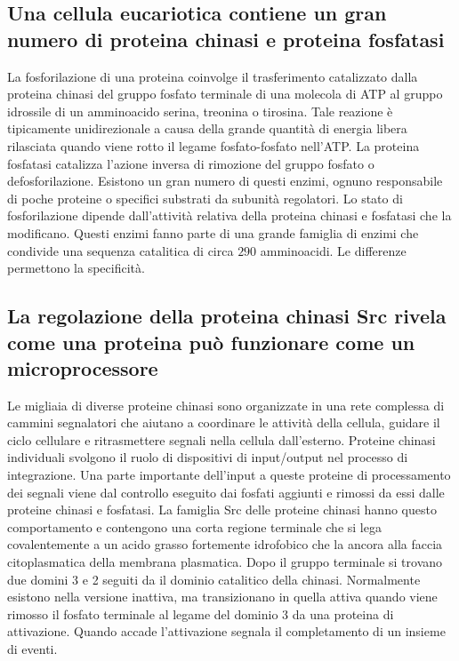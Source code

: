 \subsection{Una cellula eucariotica contiene un gran numero di proteina chinasi e proteina fosfatasi}
La fosforilazione di una proteina coinvolge il trasferimento catalizzato dalla proteina chinasi del gruppo fosfato terminale di una molecola di ATP al gruppo idrossile di un amminoacido 
serina, treonina o tirosina. Tale reazione \`e tipicamente unidirezionale a causa della grande quantit\`a di energia libera rilasciata quando viene rotto il legame fosfato-fosfato 
nell'ATP. La proteina fosfatasi catalizza l'azione inversa di rimozione del gruppo fosfato o defosforilazione. Esistono un gran numero di questi enzimi, ognuno responsabile di 
poche proteine o specifici substrati  da subunit\`a regolatori. Lo stato di fosforilazione dipende dall'attivit\`a relativa della proteina chinasi e fosfatasi che la modificano.
Questi enzimi fanno parte di una grande famiglia di enzimi che condivide una sequenza catalitica di circa $290$ amminoacidi. Le differenze permettono la specificit\`a. 
\subsection{La regolazione della proteina chinasi Src rivela come una proteina pu\`o funzionare come un microprocessore}
Le migliaia di diverse proteine chinasi sono organizzate in una rete complessa di cammini segnalatori che aiutano a coordinare le attivit\`a della cellula, guidare il ciclo cellulare e 
ritrasmettere segnali nella cellula dall'esterno. Proteine chinasi individuali svolgono il ruolo di dispositivi di input/output nel processo di integrazione. Una parte importante 
dell'input a queste proteine di processamento dei segnali viene dal controllo eseguito dai fosfati aggiunti e rimossi da essi dalle proteine chinasi e fosfatasi. La famiglia Src delle
proteine chinasi hanno questo comportamento e contengono una corta regione  terminale che si lega covalentemente a un acido grasso fortemente idrofobico che la ancora alla
faccia citoplasmatica della membrana plasmatica. Dopo il gruppo terminale si trovano due domini 3 e 2 seguiti da il dominio catalitico della chinasi. Normalmente esistono 
nella versione inattiva, ma transizionano in quella attiva quando viene rimosso il fosfato  terminale al legame del dominio 3 da una proteina di attivazione. Quando accade
l'attivazione segnala il completamento di un insieme di eventi. 
